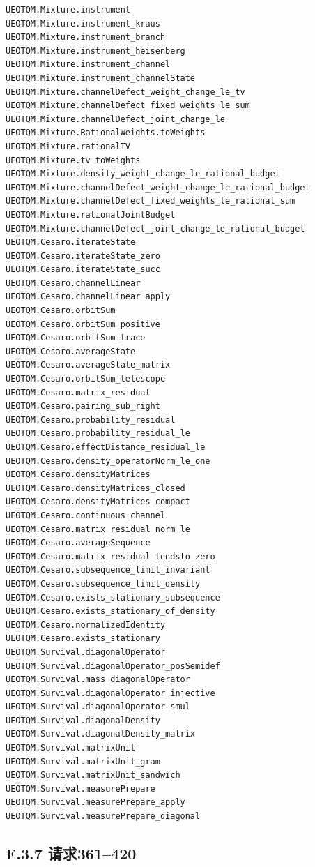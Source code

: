 \documentclass[
  11pt,
  oneside]{book}
\begin{document}
\begin{Verbatim}[breaklines,breakanywhere,fontsize=\scriptsize]
UEOTQM.Mixture.instrument
UEOTQM.Mixture.instrument_kraus
UEOTQM.Mixture.instrument_branch
UEOTQM.Mixture.instrument_heisenberg
UEOTQM.Mixture.instrument_channel
UEOTQM.Mixture.instrument_channelState
UEOTQM.Mixture.channelDefect_weight_change_le_tv
UEOTQM.Mixture.channelDefect_fixed_weights_le_sum
UEOTQM.Mixture.channelDefect_joint_change_le
UEOTQM.Mixture.RationalWeights.toWeights
UEOTQM.Mixture.rationalTV
UEOTQM.Mixture.tv_toWeights
UEOTQM.Mixture.density_weight_change_le_rational_budget
UEOTQM.Mixture.channelDefect_weight_change_le_rational_budget
UEOTQM.Mixture.channelDefect_fixed_weights_le_rational_sum
UEOTQM.Mixture.rationalJointBudget
UEOTQM.Mixture.channelDefect_joint_change_le_rational_budget
UEOTQM.Cesaro.iterateState
UEOTQM.Cesaro.iterateState_zero
UEOTQM.Cesaro.iterateState_succ
UEOTQM.Cesaro.channelLinear
UEOTQM.Cesaro.channelLinear_apply
UEOTQM.Cesaro.orbitSum
UEOTQM.Cesaro.orbitSum_positive
UEOTQM.Cesaro.orbitSum_trace
UEOTQM.Cesaro.averageState
UEOTQM.Cesaro.averageState_matrix
UEOTQM.Cesaro.orbitSum_telescope
UEOTQM.Cesaro.matrix_residual
UEOTQM.Cesaro.pairing_sub_right
UEOTQM.Cesaro.probability_residual
UEOTQM.Cesaro.probability_residual_le
UEOTQM.Cesaro.effectDistance_residual_le
UEOTQM.Cesaro.density_operatorNorm_le_one
UEOTQM.Cesaro.densityMatrices
UEOTQM.Cesaro.densityMatrices_closed
UEOTQM.Cesaro.densityMatrices_compact
UEOTQM.Cesaro.continuous_channel
UEOTQM.Cesaro.matrix_residual_norm_le
UEOTQM.Cesaro.averageSequence
UEOTQM.Cesaro.matrix_residual_tendsto_zero
UEOTQM.Cesaro.subsequence_limit_invariant
UEOTQM.Cesaro.subsequence_limit_density
UEOTQM.Cesaro.exists_stationary_subsequence
UEOTQM.Cesaro.exists_stationary_of_density
UEOTQM.Cesaro.normalizedIdentity
UEOTQM.Cesaro.exists_stationary
UEOTQM.Survival.diagonalOperator
UEOTQM.Survival.diagonalOperator_posSemidef
UEOTQM.Survival.mass_diagonalOperator
UEOTQM.Survival.diagonalOperator_injective
UEOTQM.Survival.diagonalOperator_smul
UEOTQM.Survival.diagonalDensity
UEOTQM.Survival.diagonalDensity_matrix
UEOTQM.Survival.matrixUnit
UEOTQM.Survival.matrixUnit_gram
UEOTQM.Survival.matrixUnit_sandwich
UEOTQM.Survival.measurePrepare
UEOTQM.Survival.measurePrepare_apply
UEOTQM.Survival.measurePrepare_diagonal
\end{Verbatim}

\subsection{F.3.7 请求361--420}
\end{document}
